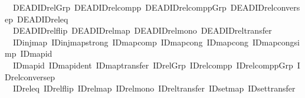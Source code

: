 \begin{isabellebody}
\ \ DEADID{\isachardot}{\kern0pt}rel{\isacharunderscore}{\kern0pt}Grp\ DEADID{\isachardot}{\kern0pt}rel{\isacharunderscore}{\kern0pt}compp\ DEADID{\isachardot}{\kern0pt}rel{\isacharunderscore}{\kern0pt}compp{\isacharunderscore}{\kern0pt}Grp\ DEADID{\isachardot}{\kern0pt}rel{\isacharunderscore}{\kern0pt}conversep\ DEADID{\isachardot}{\kern0pt}rel{\isacharunderscore}{\kern0pt}eq\isanewline
\ \ DEADID{\isachardot}{\kern0pt}rel{\isacharunderscore}{\kern0pt}flip\ DEADID{\isachardot}{\kern0pt}rel{\isacharunderscore}{\kern0pt}map\ DEADID{\isachardot}{\kern0pt}rel{\isacharunderscore}{\kern0pt}mono\ DEADID{\isachardot}{\kern0pt}rel{\isacharunderscore}{\kern0pt}transfer\isanewline
\ \ ID{\isachardot}{\kern0pt}inj{\isacharunderscore}{\kern0pt}map\ ID{\isachardot}{\kern0pt}inj{\isacharunderscore}{\kern0pt}map{\isacharunderscore}{\kern0pt}strong\ ID{\isachardot}{\kern0pt}map{\isacharunderscore}{\kern0pt}comp\ ID{\isachardot}{\kern0pt}map{\isacharunderscore}{\kern0pt}cong\ ID{\isachardot}{\kern0pt}map{\isacharunderscore}{\kern0pt}cong{}\ ID{\isachardot}{\kern0pt}map{\isacharunderscore}{\kern0pt}cong{\isacharunderscore}{\kern0pt}simp\ ID{\isachardot}{\kern0pt}map{\isacharunderscore}{\kern0pt}id\isanewline
\ \ ID{\isachardot}{\kern0pt}map{\isacharunderscore}{\kern0pt}id{}\ ID{\isachardot}{\kern0pt}map{\isacharunderscore}{\kern0pt}ident\ ID{\isachardot}{\kern0pt}map{\isacharunderscore}{\kern0pt}transfer\ ID{\isachardot}{\kern0pt}rel{\isacharunderscore}{\kern0pt}Grp\ ID{\isachardot}{\kern0pt}rel{\isacharunderscore}{\kern0pt}compp\ ID{\isachardot}{\kern0pt}rel{\isacharunderscore}{\kern0pt}compp{\isacharunderscore}{\kern0pt}Grp\ ID{\isachardot}{\kern0pt}rel{\isacharunderscore}{\kern0pt}conversep\isanewline
\ \ ID{\isachardot}{\kern0pt}rel{\isacharunderscore}{\kern0pt}eq\ ID{\isachardot}{\kern0pt}rel{\isacharunderscore}{\kern0pt}flip\ ID{\isachardot}{\kern0pt}rel{\isacharunderscore}{\kern0pt}map\ ID{\isachardot}{\kern0pt}rel{\isacharunderscore}{\kern0pt}mono\ ID{\isachardot}{\kern0pt}rel{\isacharunderscore}{\kern0pt}transfer\ ID{\isachardot}{\kern0pt}set{\isacharunderscore}{\kern0pt}map\ ID{\isachardot}{\kern0pt}set{\isacharunderscore}{\kern0pt}transfer\isanewline
%
\isadelimtheory
\isanewline
%
\endisadelimtheory
%
\isatagtheory
{}\isamarkupfalse%
%
\endisatagtheory
{\isafoldtheory}%
%
\isadelimtheory
%
\endisadelimtheory
%
\end{isabellebody}%
\endinput

